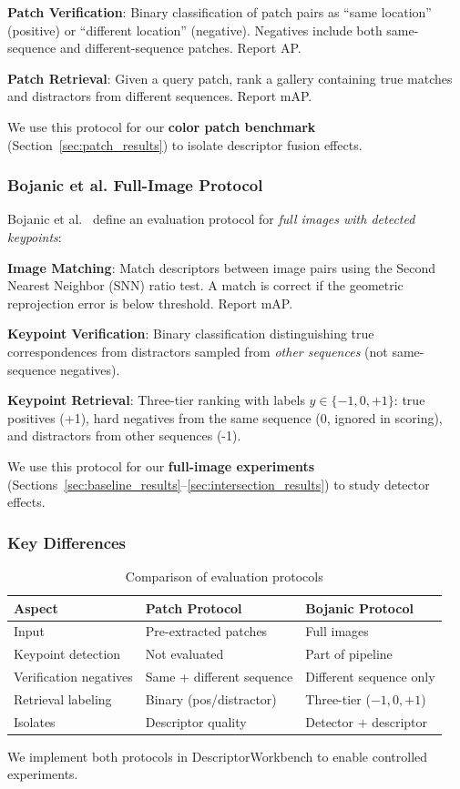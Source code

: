 \textbf{Patch Verification}: Binary classification of patch pairs as ``same location'' (positive) or ``different location'' (negative). Negatives include both same-sequence and different-sequence patches. Report AP.

\textbf{Patch Retrieval}: Given a query patch, rank a gallery containing true matches and distractors from different sequences. Report mAP.

We use this protocol for our \textbf{color patch benchmark} (Section~\ref{sec:patch_results}) to isolate descriptor fusion effects.

\subsubsection{Bojanic et al. Full-Image Protocol}

Bojanic et al.~\cite{bojanic2020comparison} define an evaluation protocol for \textit{full images with detected keypoints}:

\textbf{Image Matching}: Match descriptors between image pairs using the Second Nearest Neighbor (SNN) ratio test. A match is correct if the geometric reprojection error is below threshold. Report mAP.

\textbf{Keypoint Verification}: Binary classification distinguishing true correspondences from distractors sampled from \textit{other sequences} (not same-sequence negatives).

\textbf{Keypoint Retrieval}: Three-tier ranking with labels $y \in \{-1, 0, +1\}$: true positives (+1), hard negatives from the same sequence (0, ignored in scoring), and distractors from other sequences (-1).

We use this protocol for our \textbf{full-image experiments} (Sections~\ref{sec:baseline_results}--\ref{sec:intersection_results}) to study detector effects.

\subsubsection{Key Differences}

\begin{table}[h]
\centering
\caption{Comparison of evaluation protocols}
\label{tab:protocols}
\begin{tabular}{lll}
\toprule
\textbf{Aspect} & \textbf{Patch Protocol} & \textbf{Bojanic Protocol} \\
\midrule
Input & Pre-extracted patches & Full images \\
Keypoint detection & Not evaluated & Part of pipeline \\
Verification negatives & Same + different sequence & Different sequence only \\
Retrieval labeling & Binary (pos/distractor) & Three-tier ($-1, 0, +1$) \\
Isolates & Descriptor quality & Detector + descriptor \\
\bottomrule
\end{tabular}
\end{table}

We implement both protocols in DescriptorWorkbench to enable controlled experiments.
